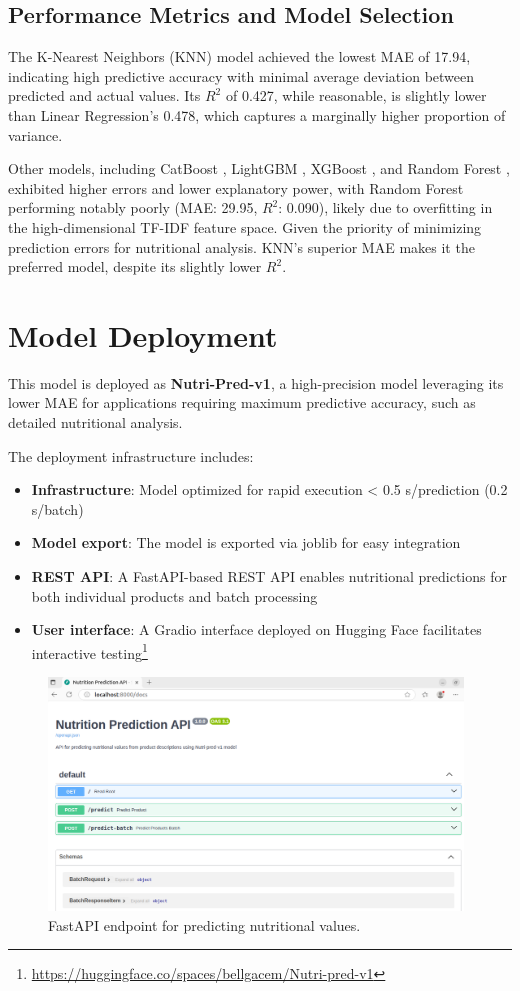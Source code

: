 \subsection{Performance Metrics and Model Selection}
 The K-Nearest Neighbors (KNN) model achieved the lowest MAE of 17.94, indicating high predictive accuracy with minimal average deviation between predicted and actual values. Its \(R^2\) of 0.427, while reasonable, is slightly lower than Linear Regression's 0.478, which captures a marginally higher proportion of variance. 
 \par Other models, including CatBoost , LightGBM , XGBoost , and Random Forest , exhibited higher errors and lower explanatory power, with Random Forest performing notably poorly (MAE: 29.95, \(R^2\): 0.090), likely due to overfitting in the high-dimensional TF-IDF feature space. Given the priority of minimizing prediction errors for nutritional analysis. KNN's superior MAE makes it the preferred model, despite its slightly lower \(R^2\). 

\section{Model Deployment}
This model is deployed as \textbf{Nutri-Pred-v1}, a high-precision model leveraging its lower MAE for applications requiring maximum predictive accuracy, such as detailed nutritional analysis.

The deployment infrastructure includes:
\begin{itemize}
    \item \textbf{Infrastructure}: Model optimized for rapid execution < 0.5 s/prediction (0.2 s/batch)
    \item \textbf{Model export}: The model is exported via joblib for easy integration
    \item \textbf{REST API}: A FastAPI-based REST API enables nutritional predictions for both individual products and batch processing
    \item \textbf{User interface}: A Gradio interface deployed on Hugging Face
facilitates interactive testing\footnote{\url{https://huggingface.co/spaces/bellgacem/Nutri-pred-v1}}
\end{itemize}

\begin{figure}[H]
    \centering
    \includegraphics[width=0.98\textwidth]{images/Nutri-pred_fast_API.png}
    \caption{FastAPI endpoint for predicting nutritional values.}
    \label{fig:fastapi_endpoint}
\end{figure}

